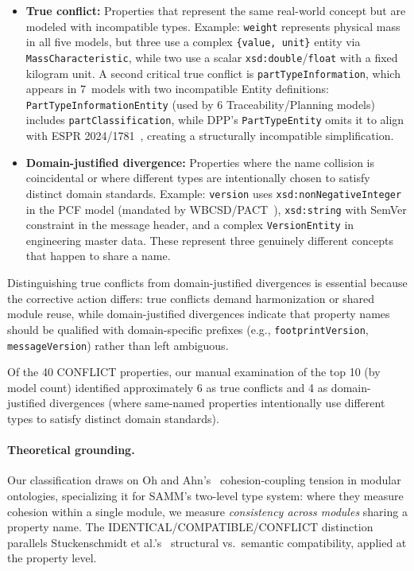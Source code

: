 \documentclass[]{ceurart}
\begin{document}
\begin{itemize}
  \item \textbf{True conflict:} Properties that represent the same
    real-world concept but are modeled with incompatible types. Example:
    \texttt{weight} represents physical mass in all five models, but three
    use a complex \texttt{\{value, unit\}} entity via
    \texttt{MassCharacteristic}, while two use a scalar
    \texttt{xsd:double}/\texttt{float} with a fixed kilogram unit.
    A second critical true conflict is \texttt{partTypeInformation},
    which appears in 7~models with two incompatible Entity definitions:
    \texttt{PartTypeInformationEntity} (used by 6
    Traceability/Planning models) includes
    \texttt{partClassification}, while DPP's \texttt{PartTypeEntity}
    omits it to align with ESPR 2024/1781~\cite{eu2024espr}, creating a structurally
    incompatible simplification.
  \item \textbf{Domain-justified divergence:} Properties where the name
    collision is coincidental or where different types are intentionally
    chosen to satisfy distinct domain standards. Example: \texttt{version}
    uses \texttt{xsd:nonNegativeInteger} in the PCF model (mandated by
    WBCSD/PACT~\cite{wbcsd2024pact}), \texttt{xsd:string} with SemVer constraint in the message
    header, and a complex \texttt{VersionEntity} in engineering master data.
    These represent three genuinely different concepts that happen to share a
    name.
\end{itemize}

\noindent
Distinguishing true conflicts from domain-justified divergences is
essential because the corrective action differs: true conflicts demand
harmonization or shared module reuse, while domain-justified divergences
indicate that property names should be qualified with domain-specific
prefixes (e.g., \texttt{footprintVersion}, \texttt{messageVersion}) rather
than left ambiguous.

Of the 40 CONFLICT properties, our manual examination of the top 10 (by
model count) identified approximately 6 as true conflicts and 4 as
domain-justified divergences (where same-named properties intentionally
use different types to satisfy distinct domain standards).

\paragraph{Theoretical grounding.}
Our classification draws on Oh and Ahn's~\cite{oh2009ontology}
cohesion-coupling tension in modular ontologies, specializing it for
SAMM's two-level type system: where they measure cohesion within a
single module, we measure \emph{consistency across modules} sharing a
property name. The IDENTICAL/COMPATIBLE/CONFLICT distinction parallels
Stuckenschmidt et al.'s~\cite{stuckenschmidt2009modular} structural
vs.\ semantic compatibility, applied at the property level.
\end{document}
